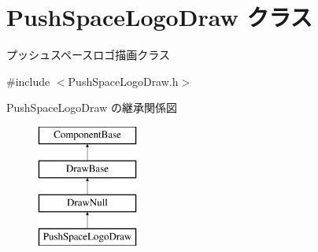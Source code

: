 \hypertarget{class_push_space_logo_draw}{}\section{Push\+Space\+Logo\+Draw クラス}
\label{class_push_space_logo_draw}


プッシュスペースロゴ描画クラス  




{\ttfamily \#include $<$Push\+Space\+Logo\+Draw.\+h$>$}

Push\+Space\+Logo\+Draw の継承関係図\begin{figure}[H]
\begin{center}
\leavevmode
\includegraphics[height=4.000000cm]{class_push_space_logo_draw}
\end{center}
\end{figure}
